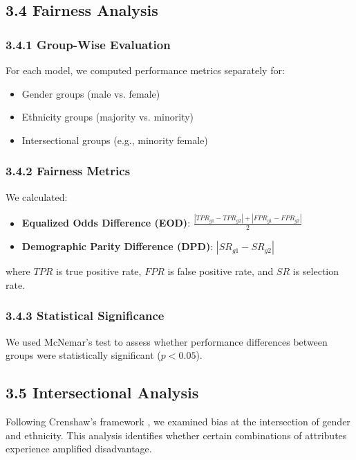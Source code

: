 \documentclass[12pt,a4paper]{article}
\begin{document}
\subsection{3.4 Fairness Analysis}

\subsubsection{3.4.1 Group-Wise Evaluation}

For each model, we computed performance metrics separately for:
\begin{itemize}
    \item Gender groups (male vs. female)
    \item Ethnicity groups (majority vs. minority)
    \item Intersectional groups (e.g., minority female)
\end{itemize}

\subsubsection{3.4.2 Fairness Metrics}

We calculated:
\begin{itemize}
    \item \textbf{Equalized Odds Difference (EOD)}: 
          $\frac{|TPR_{g1} - TPR_{g2}| + |FPR_{g1} - FPR_{g2}|}{2}$
    \item \textbf{Demographic Parity Difference (DPD)}: 
          $|SR_{g1} - SR_{g2}|$
\end{itemize}

where $TPR$ is true positive rate, $FPR$ is false positive rate, and $SR$ 
is selection rate.

\subsubsection{3.4.3 Statistical Significance}

We used McNemar's test to assess whether performance differences between 
groups were statistically significant ($p < 0.05$).

\subsection{3.5 Intersectional Analysis}

Following Crenshaw's framework \cite{crenshaw1989}, we examined bias at 
the intersection of gender and ethnicity. This analysis identifies whether 
certain combinations of attributes experience amplified disadvantage.
\end{document}
